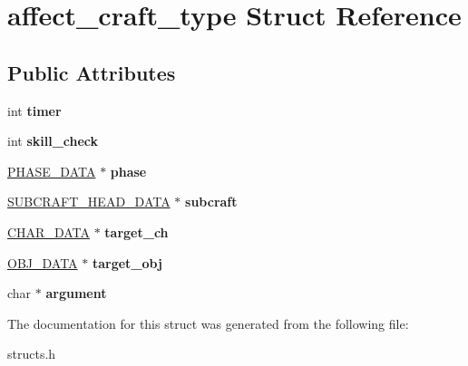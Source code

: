 \hypertarget{structaffect__craft__type}{\section{affect\-\_\-craft\-\_\-type Struct Reference}
\label{structaffect__craft__type}
}
\subsection*{Public Attributes}
\begin{DoxyCompactItemize}
\item 
\hypertarget{structaffect__craft__type_a4e7d13094bc6a1ab21b1798ca2d26024}{int {\bfseries timer}}\label{structaffect__craft__type_a4e7d13094bc6a1ab21b1798ca2d26024}

\item 
\hypertarget{structaffect__craft__type_afed3aadcdda4757cec543e78fcd888fa}{int {\bfseries skill\-\_\-check}}\label{structaffect__craft__type_afed3aadcdda4757cec543e78fcd888fa}

\item 
\hypertarget{structaffect__craft__type_a5b6b383242ec944741b103e7fded20be}{\hyperlink{structphase__data}{P\-H\-A\-S\-E\-\_\-\-D\-A\-T\-A} $\ast$ {\bfseries phase}}\label{structaffect__craft__type_a5b6b383242ec944741b103e7fded20be}

\item 
\hypertarget{structaffect__craft__type_a1e65ee34eae30342f41ebf59af807cc2}{\hyperlink{structsubcraft__head__data}{S\-U\-B\-C\-R\-A\-F\-T\-\_\-\-H\-E\-A\-D\-\_\-\-D\-A\-T\-A} $\ast$ {\bfseries subcraft}}\label{structaffect__craft__type_a1e65ee34eae30342f41ebf59af807cc2}

\item 
\hypertarget{structaffect__craft__type_ad3d71166632dffcb09cd945ee3ebdd89}{\hyperlink{structchar__data}{C\-H\-A\-R\-\_\-\-D\-A\-T\-A} $\ast$ {\bfseries target\-\_\-ch}}\label{structaffect__craft__type_ad3d71166632dffcb09cd945ee3ebdd89}

\item 
\hypertarget{structaffect__craft__type_ae487885f5441a7b2d1064e4d0f1973ce}{\hyperlink{structobj__data}{O\-B\-J\-\_\-\-D\-A\-T\-A} $\ast$ {\bfseries target\-\_\-obj}}\label{structaffect__craft__type_ae487885f5441a7b2d1064e4d0f1973ce}

\item 
\hypertarget{structaffect__craft__type_a2b2da639c4d0e96357113be658456a3e}{char $\ast$ {\bfseries argument}}\label{structaffect__craft__type_a2b2da639c4d0e96357113be658456a3e}

\end{DoxyCompactItemize}


The documentation for this struct was generated from the following file\-:\begin{DoxyCompactItemize}
\item 
structs.\-h\end{DoxyCompactItemize}

